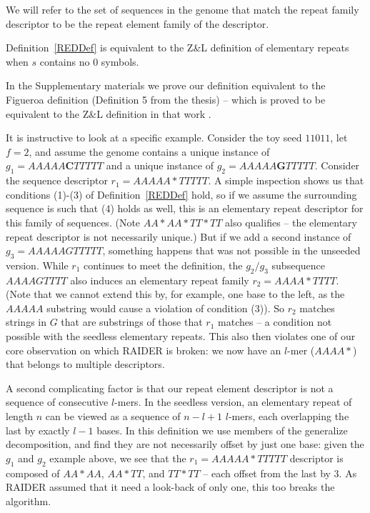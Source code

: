 \documentclass{bmcart}
\begin{document}
We will refer to the set of sequences in the genome that match the
repeat family descriptor to be the repeat element family of the
descriptor.

\begin{theorem}
Definition~\ref{REDDef} is equivalent to the Z\&L
definition of elementary repeats when $s$ contains no 0 symbols.
\end{theorem}
In the Supplementary materials we prove our definition equivalent to
the Figueroa definition (Definition 5 from the thesis) -- which is
proved to be equivalent to the Z\&L definition in that work \cite{Figueroa:2014uk}.

It is instructive to look at a specific example.  Consider the toy
seed $11011$, let $f=2$, and assume the genome contains a unique
instance of $g_1 = AAAAA{\mathbf C}TTTTT$ and a unique instance of
$g_2 = AAAAA{\mathbf G}TTTTT$.  Consider the sequence descriptor $r_1
= AAAAA*TTTTT$.  A simple inspection shows us that conditions (1)-(3)
of Definition~\ref{REDDef} hold, so if we assume the surrounding
sequence is such that (4) holds as well, this is an elementary repeat
descriptor for this family of sequences.  (Note $AA*AA*TT*TT$ also qualifies -- the
elementary repeat descriptor is not necessarily unique.)  But if we add a second
instance of $g_3 = AAAAAGTTTTT$, something happens that was not
possible in the unseeded version.  While $r_1$ continues to meet the definition, the $g_2/g_3$
subsequence $AAAAGTTTT$ also induces an elementary repeat family
$r_2 = AAAA*TTTT$. (Note that we cannot extend this by, for example,
one base to the left, as the $AAAAA$ substring would cause a violation
of condition (3)).  So $r_2$ matches strings in $G$ that are
substrings of those that $r_1$ matches -- a condition not possible
with the seedless elementary repeats.  This also then violates one of
our core observation on which RAIDER is broken: we now have an $l$-mer
($AAAA*$) that belongs to multiple descriptors.

A second complicating factor is that our repeat element descriptor is
not a sequence of consecutive $l$-mers. In the seedless version, an
elementary repeat of length $n$ can be viewed as a sequence of $n-l+1$
$l$-mers, each overlapping the last by exactly $l-1$ bases. In this
definition we use members of the generalize decomposition, and find
they are not necessarily offset by just one base: given the $g_1$ and
$g_2$ example above, we see that the $r_1 = AAAAA*TTTTT$ descriptor is
composed of $AA*AA$, $AA*TT$, and $TT*TT$ -- each offset from the last
by 3.  As RAIDER assumed that it need a look-back of only one, this
too breaks the algorithm.
\end{document}
